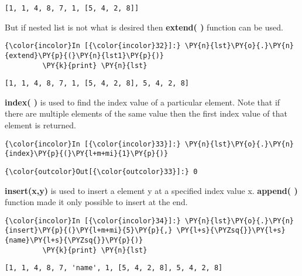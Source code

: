     \begin{Verbatim}[commandchars=\\\{\}]
[1, 1, 4, 8, 7, 1, [5, 4, 2, 8]]
    \end{Verbatim}

    But if nested list is not what is desired then \textbf{extend( )}
function can be used.

    \begin{Verbatim}[commandchars=\\\{\}]
{\color{incolor}In [{\color{incolor}32}]:} \PY{n}{lst}\PY{o}{.}\PY{n}{extend}\PY{p}{(}\PY{n}{lst1}\PY{p}{)}
         \PY{k}{print} \PY{n}{lst}
\end{Verbatim}

    \begin{Verbatim}[commandchars=\\\{\}]
[1, 1, 4, 8, 7, 1, [5, 4, 2, 8], 5, 4, 2, 8]
    \end{Verbatim}

    \textbf{index( )} is used to find the index value of a particular
element. Note that if there are multiple elements of the same value then
the first index value of that element is returned.

    \begin{Verbatim}[commandchars=\\\{\}]
{\color{incolor}In [{\color{incolor}33}]:} \PY{n}{lst}\PY{o}{.}\PY{n}{index}\PY{p}{(}\PY{l+m+mi}{1}\PY{p}{)}
\end{Verbatim}

            \begin{Verbatim}[commandchars=\\\{\}]
{\color{outcolor}Out[{\color{outcolor}33}]:} 0
\end{Verbatim}
        
    \textbf{insert(x,y)} is used to insert a element y at a specified index
value x. \textbf{append( )} function made it only possible to insert at
the end.

    \begin{Verbatim}[commandchars=\\\{\}]
{\color{incolor}In [{\color{incolor}34}]:} \PY{n}{lst}\PY{o}{.}\PY{n}{insert}\PY{p}{(}\PY{l+m+mi}{5}\PY{p}{,} \PY{l+s}{\PYZsq{}}\PY{l+s}{name}\PY{l+s}{\PYZsq{}}\PY{p}{)}
         \PY{k}{print} \PY{n}{lst}
\end{Verbatim}

    \begin{Verbatim}[commandchars=\\\{\}]
[1, 1, 4, 8, 7, 'name', 1, [5, 4, 2, 8], 5, 4, 2, 8]
    \end{Verbatim}

